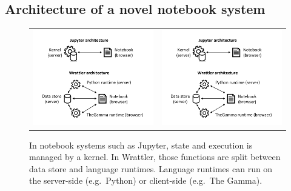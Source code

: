 \documentclass[fleqn,11pt]{report}
\theoremstyle{definition}
\begin{document}
\subsection{Architecture of a novel notebook system}

\begin{figure}[t]
\vspace{0.5em}
\begin{tabular}{p{} p{}}
\vspace{2em}\includegraphics[scale=0.6,trim=1.5cm 6cm 1cm 0.4cm,clip]{img/arch.pdf} &
\vspace{0em}\includegraphics[scale=0.6,trim=1cm 0.5cm 1cm 4cm,clip]{img/arch.pdf}
\end{tabular}
\caption{In notebook systems such as Jupyter, state and execution is managed by a kernel. In
  Wrattler, those functions are split between data store and language runtimes. Language runtimes
  can run on the server-side (e.g.~Python) or client-side (e.g.~The Gamma).}
\label{fig:arch}
\vspace{0.5em}
\end{figure}
\end{document}
